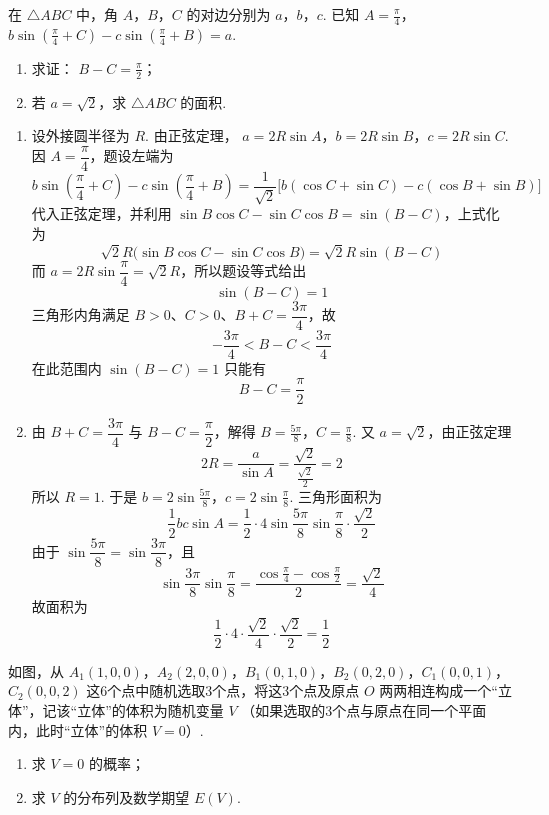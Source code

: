 \begin{problem}
在 \(\triangle ABC\) 中，角 \(A\)，\(B\)，\(C\) 的对边分别为 \(a\)，\(b\)，\(c\). 已知 \(A = \frac{\pi}{4}\)，\(b \sin \left(\frac{\pi}{4} + C\right) - c \sin \left(\frac{\pi}{4} + B\right) = a\).
\begin{enumerate}
\item 求证： \(B - C = \frac{\pi}{2}\)；
\item 若 \(a = \sqrt{2}\)，求 \(\triangle ABC\) 的面积.
\end{enumerate}
\end{problem}

\begin{solution}
\begin{enumerate}
\item 设外接圆半径为 \(R\). 由正弦定理，
\(a=2R\sin A\)，\(b=2R\sin B\)，\(c=2R\sin C\).
因 \(A=\dfrac\pi4\)，题设左端为
\[
b\sin\left(\frac\pi4+C\right)
-c\sin\left(\frac\pi4+B\right)
=\frac1{\sqrt2}\bigl[b(\cos C+\sin C)-c(\cos B+\sin B)\bigr]
\]
代入正弦定理，并利用
\(\sin B\cos C-\sin C\cos B=\sin(B-C)\)，上式化为
\[
\sqrt2R\bigl(\sin B\cos C-\sin C\cos B\bigr)
=\sqrt2R\sin(B-C)
\]
而 \(a=2R\sin\dfrac\pi4=\sqrt2R\)，所以题设等式给出
\[
\sin(B-C)=1
\]
三角形内角满足 \(B>0\)、\(C>0\)、\(B+C=\dfrac{3\pi}{4}\)，故
\[
-\frac{3\pi}{4}<B-C<\frac{3\pi}{4}
\]
在此范围内 \(\sin(B-C)=1\) 只能有
\[
B-C=\frac\pi2
\]
\item 由 \(B+C=\dfrac{3\pi}{4}\) 与 \(B-C=\dfrac\pi2\)，解得
\(B=\frac{5\pi}{8}\)，\(C=\frac\pi8\).
又 \(a=\sqrt2\)，由正弦定理
\[
2R=\frac{a}{\sin A}=\frac{\sqrt2}{\frac{\sqrt2}{2}}=2
\]
所以 \(R=1\). 于是
\(b=2\sin\frac{5\pi}{8}\)，\(c=2\sin\frac\pi8\).
三角形面积为
\[
\frac12bc\sin A
=\frac12\cdot4\sin\frac{5\pi}{8}\sin\frac\pi8\cdot\frac{\sqrt2}{2}
\]
由于 \(\sin\dfrac{5\pi}{8}=\sin\dfrac{3\pi}{8}\)，且
\[
\sin\frac{3\pi}{8}\sin\frac\pi8
=\frac{\cos\frac\pi4-\cos\frac\pi2}{2}
=\frac{\sqrt2}{4}
\]
故面积为
\[
\frac12\cdot4\cdot\frac{\sqrt2}{4}\cdot\frac{\sqrt2}{2}
=\frac12
\]
\end{enumerate}
\end{solution}

\begin{problem}
如图，从 \(A_{1}(1,0,0)\)，\(A_{2}(2,0,0)\)，\(B_{1}(0,1,0)\)，\(B_{2}(0,2,0)\)，\(C_{1}(0,0,1)\)，\(C_{2}(0,0,2)\) 这6个点中随机选取3个点，将这3个点及原点 \(O\) 两两相连构成一个“立体”，记该“立体”的体积为随机变量 \(V\) （如果选取的3个点与原点在同一个平面内，此时“立体”的体积 \(V = 0\)）.
\begin{enumerate}
\item 求 \(V = 0\) 的概率；
\item 求 \(V\) 的分布列及数学期望 \(E(V)\).
\end{enumerate}

\end{problem}

